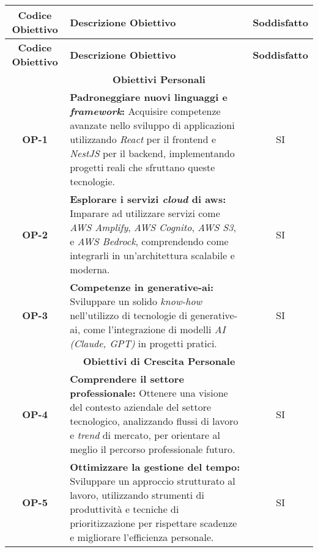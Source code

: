 \begin{longtable}{|c|>{\centering\arraybackslash}p{}|c|} %
    \hline
    \rowcolor{green!30} %
    \textbf{Codice Obiettivo} & \textbf{Descrizione Obiettivo} & \textbf{Soddisfatto}\\
    \hline
    \endfirsthead %
    
    \hline
    \rowcolor{green!30} %
    \textbf{Codice Obiettivo} & \textbf{Descrizione Obiettivo}  & \textbf{Soddisfatto}\\
    \hline
    \endhead %
    
    \hline
    \multicolumn{3}{|c|}{\rowcolor{green!30} \textbf{Obiettivi Personali}} \\
    \hline
    \textbf{OP-1} & \textbf{Padroneggiare nuovi linguaggi e \textit{framework}:} Acquisire competenze avanzate nello sviluppo di applicazioni utilizzando \textit{React} per il \gls{frontend} e \textit{NestJS} per il \gls{backend}, implementando progetti reali che sfruttano queste tecnologie. & SI \\
    \hline
    \textbf{OP-2} & \textbf{Esplorare i servizi \textit{cloud} di \gls{aws}:} Imparare ad utilizzare servizi come \textit{AWS Amplify}, \textit{AWS Cognito}, \textit{AWS S3}, e \textit{AWS Bedrock}, comprendendo come integrarli in un’architettura scalabile e moderna. & SI\\
    \hline
    \textbf{OP-3} & \textbf{Competenze in \gls{generative-ai}:} Sviluppare un solido \textit{know-how} nell’utilizzo di tecnologie di \gls{generative-ai}, come l’integrazione di modelli \textit{AI (Claude, GPT)} in progetti pratici.& SI \\
    \hline
    \multicolumn{3}{|c|}{\rowcolor{green!30} \textbf{Obiettivi di Crescita Personale}} \\
    \hline
    \textbf{OP-4} & \textbf{Comprendere il settore professionale:} Ottenere una visione del contesto aziendale del settore tecnologico, analizzando flussi di lavoro e \textit{trend} di mercato, per orientare al meglio il percorso professionale futuro.& SI \\
    \hline
    \textbf{OP-5} & \textbf{Ottimizzare la gestione del tempo:} Sviluppare un approccio strutturato al lavoro, utilizzando strumenti di produttività e tecniche di prioritizzazione per rispettare scadenze e migliorare l’efficienza personale. & SI\\

\end{longtable}
